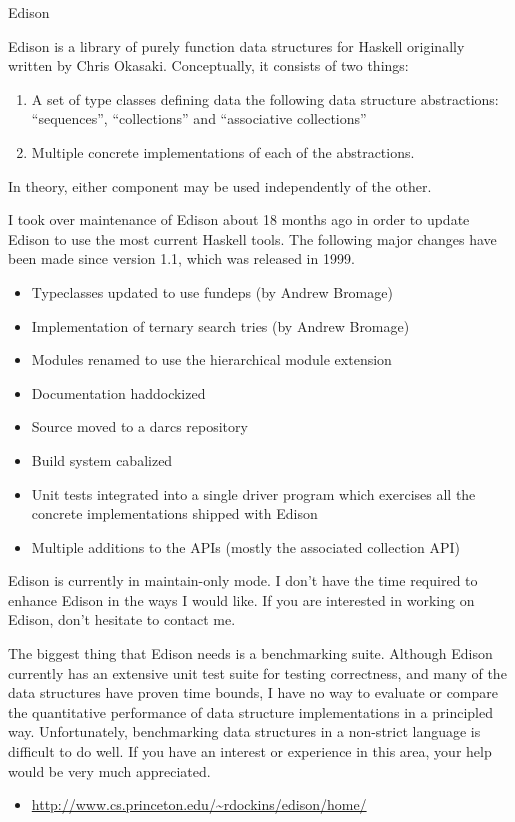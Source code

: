\documentclass{article}
\begin{document}
\begin{hcarentry}{Edison}
\makeheader

Edison is a library of purely function data structures for Haskell
originally written by Chris Okasaki.  Conceptually, it consists of two
things:
\begin{enumerate}
\item A set of type classes defining data the following data structure
      abstractions: ``sequences'', ``collections'' and ``associative collections''
\item Multiple concrete implementations of each of the abstractions.
\end{enumerate}


In theory, either component may be used independently of the other.

I took over maintenance of Edison about 18 months ago
in order to update Edison to use the most current Haskell tools.
The following major changes have been made since version 1.1, which
was released in 1999.

\begin{itemize}
\item Typeclasses updated to use fundeps (by Andrew Bromage)
\item Implementation of ternary search tries (by Andrew Bromage)
\item Modules renamed to use the hierarchical module extension
\item Documentation haddockized
\item Source moved to a darcs repository
\item Build system cabalized
\item Unit tests integrated into a single driver program which exercises
      all the concrete implementations shipped with Edison
\item Multiple additions to the APIs (mostly the associated collection API)
\end{itemize}


Edison is currently in maintain-only mode. I don't have the time required
to enhance Edison in the ways I would like.  If you are interested in
working on Edison, don't hesitate to contact me.

The biggest thing that Edison needs is a benchmarking suite.  Although
Edison currently has an extensive unit test suite for testing correctness,
and many of the data structures have proven time bounds,
I have no way to evaluate or compare the quantitative
performance of data structure implementations in a
principled way.  Unfortunately, benchmarking data structures
in a non-strict language is difficult to do well.
If you have an interest or experience in this area, your help
would be very much appreciated.

\FurtherReading
\begin{itemize}
\item \url{http://www.cs.princeton.edu/~rdockins/edison/home/}
\end{itemize}
\end{hcarentry}
\end{document}
